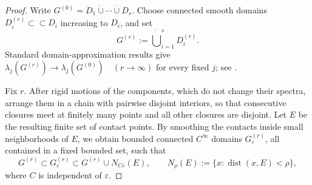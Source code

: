 \documentclass[11pt,letterpaper,reqno]{amsart}
\theoremstyle{definition}
\begin{document}
\begin{proof}
Write \(G^{(0)}=D_1\mathbin{\dot\cup}\cdots\mathbin{\dot\cup}D_s\). Choose connected smooth domains \(D_i^{(r)}\subset \subset D_i\) increasing to \(D_i\), and set
\[
G^{(r)}:=\mathbin{\dot\bigcup}_{i=1}^s D_i^{(r)}.
\]
Standard domain-approximation results give $
\lambda_j(G^{(r)})\longrightarrow\lambda_j(G^{(0)})
\quad (r\to\infty)$ for every fixed \(j\); see
\cite[Proposition~7.1, Corollary~4.7, and Remark~4.3]{Daners2003}.

Fix \(r\). After rigid motions of the components, which do not change
their spectra, arrange them in a chain with pairwise disjoint interiors,
so that consecutive closures meet at finitely many points and all other
closures are disjoint. Let \(E\) be the resulting finite set of
contact points.  By smoothing the contacts inside small neighborhoods of
\(E\), we obtain bounded connected \(C^\infty\) domains
\(G^{(r)}_\varepsilon\), all contained in a fixed bounded set, such that
\begin{equation}\label{eq:handle-inclusions}
 G^{(r)}\subset G^{(r)}_\varepsilon
 \subset G^{(r)}\cup N_{C\varepsilon}(E),
 \qquad
 N_\rho(E):=\{x:\operatorname{dist}(x,E)<\rho\},
\end{equation}
where \(C\) is independent of \(\varepsilon\).


\end{proof}
\end{document}
